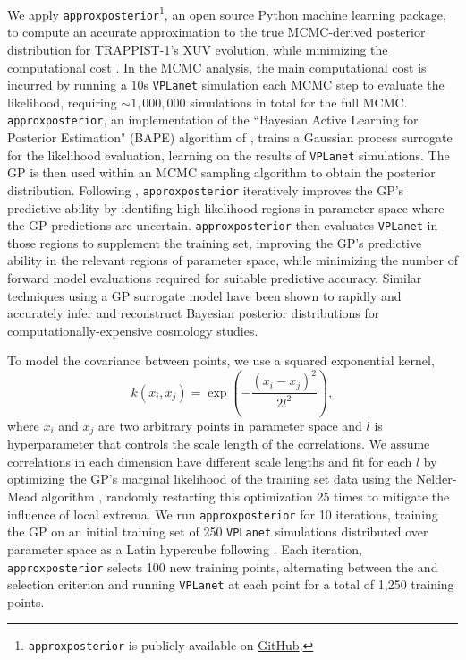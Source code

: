 \documentclass[twocolumn]{aastex62}
\newcommand{\vplanet}[0]{\texttt{VPLanet}\xspace}
\newcommand{\approxposterior}[0]{\texttt{approxposterior}\xspace}
\begin{document}
We apply \approxposterior\footnote{\approxposterior is publicly available on \href{https://github.com/dflemin3/approxposterior}{GitHub}.}, an open source Python machine learning package, to compute an accurate approximation to the true MCMC-derived posterior distribution for TRAPPIST-1's XUV evolution, while minimizing the computational cost \citep{FlemingVanderPlas2018}. In the MCMC analysis, the main computational cost is incurred by running a $10$s \vplanet simulation each MCMC step to evaluate the likelihood, requiring ${\sim}1,000,000$ simulations in total for the full MCMC. \approxposterior, an implementation of the ``Bayesian Active Learning for Posterior Estimation" (BAPE) algorithm of \citet{Kandasamy2015}, trains a Gaussian process \citep[GP, ][]{Rasmussen2006} surrogate for the likelihood evaluation, learning on the results of \vplanet simulations. The GP is then used within an MCMC sampling algorithm to obtain the posterior distribution. Following \citet{Kandasamy2015}, \approxposterior iteratively improves the GP's predictive ability by identifing high-likelihood regions in parameter space where the GP predictions are uncertain. \approxposterior then evaluates \vplanet in those regions to supplement the training set, improving the GP's predictive ability in the relevant regions of parameter space, while minimizing the number of forward model evaluations required for suitable predictive accuracy. Similar techniques using a GP surrogate model have been shown to rapidly and accurately infer \citep[e.g.][]{Bird2019,Rogers2019,Takhtaganov2019} and reconstruct \citep{McClintock2019} Bayesian posterior distributions for computationally-expensive cosmology studies.

To model the covariance between points, we use a squared exponential kernel,
\begin{equation} \label{eqn:kernel}
k(x_i, x_j) = \exp \left( - \frac{(x_i - x_j)^2}{2l^2} \right),
\end{equation}
where $x_i$ and $x_j$ are two arbitrary points in parameter space and $l$ is hyperparameter that controls the scale length of the correlations. We assume correlations in each dimension have different scale lengths and fit for each $l$ by optimizing the GP's marginal likelihood of the training set data using the Nelder-Mead algorithm \citep{Nelder1965}, randomly restarting this optimization 25 times to mitigate the influence of local extrema. We run \approxposterior for 10 iterations, training the GP on an initial training set of 250 \vplanet simulations distributed over parameter space as a Latin hypercube following \citet{Bird2019}. Each iteration, \approxposterior selects 100 new training points, alternating between the \citet{Kandasamy2015} and \citet{Wang2017} selection criterion and running \vplanet at each point for a total of 1,250 training points. 
\end{document}
